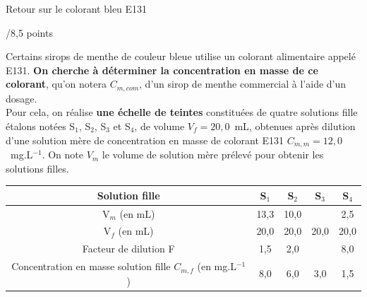 \begin{doc}{Retour sur le colorant bleu E131 \begin{Large}
    /8,5 points
\end{Large}}
\begin{figure}
  \end{figure}
Certains sirops de menthe de couleur bleue utilise un colorant alimentaire appelé E131. \textbf{On cherche à déterminer la concentration en masse de ce colorant}, qu'on notera $C_{m,com}$, d'un sirop de menthe commercial à l'aide d'un dosage.\\
Pour cela, on réalise \textbf{une échelle de teintes} constituées de quatre solutions fille étalons notées S$_1$, S$_2$, S$_3$ et S$_4$, de volume $V_{f}=20,0$~mL, obtenues après dilution d'une solution mère de concentration en masse de colorant E131 $C_{m,m}=12,0$~mg.L$^{-1}$. On note $V_{m}$ le volume de solution mère prélevé pour obtenir les solutions filles.\\
\begin{tabular}{|C{0.6}|C{0.13}|C{0.13}|C{0.13}|C{0.13}|}
    \hline
     Solution fille & S$_1$ & S$_2$ & S$_3$ & S$_4$ \\
    \hline
     V$_m$ (en mL) & 13,3 & 10,0 &  & 2,5 \\
    \hline 
     V$_f$ (en mL) & 20,0 & 20,0 & 20,0 & 20,0 \\
    \hline
     Facteur de dilution F & 1,5 & 2,0 & & 8,0 \\
    \hline
     Concentration en masse solution fille $C_{m,f}$ (en mg.L$^{-1}$) & 8,0 & 6,0 & 3,0 & 1,5 \\
    \hline
\end{tabular}
\\


\end{doc}
